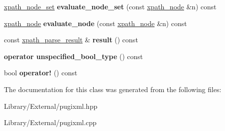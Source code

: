 \begin{DoxyCompactItemize}
\item 
\hypertarget{classpugi_1_1xpath__query_ad5e3826c813e90c30db42f1778bc8adc}{}\hyperlink{classpugi_1_1xpath__node__set}{xpath\+\_\+node\+\_\+set} {\bfseries evaluate\+\_\+node\+\_\+set} (const \hyperlink{classpugi_1_1xpath__node}{xpath\+\_\+node} \&n) const \label{classpugi_1_1xpath__query_ad5e3826c813e90c30db42f1778bc8adc}

\item 
\hypertarget{classpugi_1_1xpath__query_a756612fde24e703bc61fedf8ac4e84ae}{}\hyperlink{classpugi_1_1xpath__node}{xpath\+\_\+node} {\bfseries evaluate\+\_\+node} (const \hyperlink{classpugi_1_1xpath__node}{xpath\+\_\+node} \&n) const \label{classpugi_1_1xpath__query_a756612fde24e703bc61fedf8ac4e84ae}

\item 
\hypertarget{classpugi_1_1xpath__query_a36d9bd4c41c46ee085e7cb4af8ced7d3}{}const \hyperlink{structpugi_1_1xpath__parse__result}{xpath\+\_\+parse\+\_\+result} \& {\bfseries result} () const \label{classpugi_1_1xpath__query_a36d9bd4c41c46ee085e7cb4af8ced7d3}

\item 
\hypertarget{classpugi_1_1xpath__query_a3e3410d6f652ada1ac9e059ebe87184c}{}{\bfseries operator unspecified\+\_\+bool\+\_\+type} () const \label{classpugi_1_1xpath__query_a3e3410d6f652ada1ac9e059ebe87184c}

\item 
\hypertarget{classpugi_1_1xpath__query_aaf62ebc3aa5dbce405ee1dbdd55e779a}{}bool {\bfseries operator!} () const \label{classpugi_1_1xpath__query_aaf62ebc3aa5dbce405ee1dbdd55e779a}

\end{DoxyCompactItemize}


The documentation for this class was generated from the following files\+:\begin{DoxyCompactItemize}
\item 
Library/\+External/pugixml.\+hpp\item 
Library/\+External/pugixml.\+cpp\end{DoxyCompactItemize}
